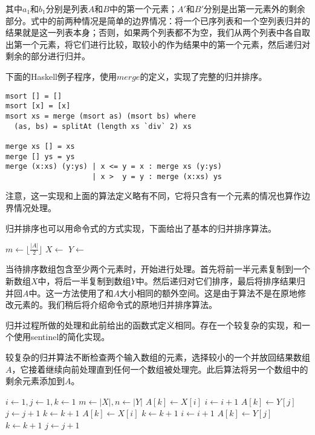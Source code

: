 \documentclass{ctexart}
\begin{document}
其中$a_1$和$b_1$分别是列表$A$和$B$中的第一个元素；$A'$和$B'$分别是出第一元素外的剩余部分。式中的前两种情况是简单的边界情况：将一个已序列表和一个空列表归并的结果就是这一列表本身；否则，如果两个列表都不为空，我们从两个列表中各自取出第一个元素，将它们进行比较，取较小的作为结果中的第一个元素，然后递归对剩余的部分进行归并。

下面的Haskell例子程序，使用$merge$的定义，实现了完整的归并排序。

\lstset{language=Haskell}
\begin{lstlisting}[style=Haskell]
msort [] = []
msort [x] = [x]
msort xs = merge (msort as) (msort bs) where
  (as, bs) = splitAt (length xs `div` 2) xs

merge xs [] = xs
merge [] ys = ys
merge (x:xs) (y:ys) | x <= y = x : merge xs (y:ys)
                    | x >  y = y : merge (x:xs) ys
\end{lstlisting}

注意，这一实现和上面的算法定义略有不同，它将只含有一个元素的情况也算作边界情况处理。

归并排序也可以用命令式的方式实现，下面给出了基本的归并排序算法。

\begin{algorithmic}[1]
    \State $m \gets \lfloor \frac{|A|}{2} \rfloor$
    \State $X \gets$ 
    \State $Y \gets$ 
    \State {}
    \State {}
    \State {}
  \EndIf
\EndProcedure
\end{algorithmic}

当待排序数组包含至少两个元素时，开始进行处理。首先将前一半元素复制到一个新数组$X$中，将后一半复制到数组$Y$中。然后递归对它们排序，最后将排序结果归并回$A$中。这一方法使用了和$A$大小相同的额外空间。这是由于算法不是在原地修改元素的。我们稍后将介绍命令式的原地归并排序算法。

归并过程所做的处理和此前给出的函数式定义相同。存在一个较复杂的实现，和一个使用sentinel的简化实现。

较复杂的归并算法不断检查两个输入数组的元素，选择较小的一个并放回结果数组$A$，它接着继续向前处理直到任何一个数组被处理完。此后算法将另一个数组中的剩余元素添加到$A$。

\begin{algorithmic}[1]
  \State $i \gets 1, j\gets 1, k\gets 1$
  \State $m \gets |X|, n \gets |Y|$
      \State $A[k] \gets X[i]$
      \State $i \gets i + 1$
    \Else
      \State $A[k] \gets Y[j]$
      \State $j \gets j + 1$
    \EndIf
    \State $k \gets k + 1$
  \EndWhile
    \State $A[k] \gets X[i]$
    \State $k \gets k + 1$
    \State $i \gets i + 1$
  \EndWhile
    \State $A[k] \gets Y[j]$
    \State $k \gets k + 1$
    \State $j \gets j + 1$
  \EndWhile
\EndProcedure
\end{algorithmic}
\end{document}

